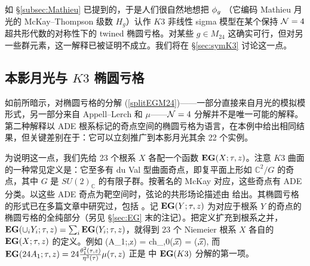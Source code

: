 如 \S\ref{subsec:Mathieu} 已提到的，于是人们很自然地想把 $\phi_g$ （它编码 Mathieu 月光的 McKay--Thompson 级数 $H_g$）认作 $K3$ 非线性 sigma 模型在某个保持 ${\cal N}=4$ 超共形代数的对称性下的 twined 椭圆亏格。对某些 $g\in M_{24}$ 这确实可行，但对另一些群元素，这一解释已被证明不成立。我们将在 \S \ref{sec:symK3} 讨论这一点。

\subsection{本影月光与 $K3$ 椭圆亏格}
\label{sec:umK3}

如前所暗示，对椭圆亏格的分解 (\ref{splitEGM24})——一部分直接来自月光的模拟模形式，另一部分来自 Appell--Lerch 和 $\mu$——${\cal N}=4$ 分解并不是唯一可能的解释。第二种解释以 ADE 根系标记的奇点空间的椭圆亏格为语言，在本例中给出相同结果，但关键差别在于：它可以立刻推广到本影月光其余 22 个实例。


为说明这一点，我们先给 23 个根系 $X$ 各配一个函数 ${\bf EG}(X;\tau,z)$。注意 $K3$ 曲面的一种常见定义是：它至多有 du Val 型曲面奇点，即复平面上形如 $\mathbb C^2/G$ 的奇点，其中 $G$ 是 $SU(2)_{\mathbb C}$ 的有限子群。按著名的 McKay 对应，这些奇点有 ADE 分类。以这些 ADE 奇点为靶空间时，弦论的共形场论描述由 \cite{Ooguri:1995wj} 给出。其椭圆亏格的形式已在多篇文章中研究过，包括 \cite{Troost:2010ud,Eguchi:2010cb,Ashok:2011cy,Ashok:2013pya,Murthy:2013mya,Cheng:2014zpa,Harvey:2014nha}。记 ${\bf EG}(Y;\tau,z)$ 为对应于根系 $Y$ 的奇点的椭圆亏格的全纯部分（另见 \S\ref{sec:EG} 末的注记）。把定义扩充到根系之并，${\bf EG}(\cup_i Y_i;\tau,z)= \sum_i {\bf EG}( Y_i;\tau,z)$，就得到 23 个 Niemeier 根系 $X$ 各自的 ${\bf EG}(X;\tau,z)$ 的定义。例如
\be
\eg(A_1;\tau,z) = ch_{,0}(\t,z) =  \m(\t,z), 
\ee
而 ${\bf EG}(24A_1;\tau,z) = 24\frac{\theta_1^2(\tau,z)}{\eta^3(\tau)} \mu(\tau,z)$ 正是  中 ${\bf EG}(K3)$ 分解的第一项。


